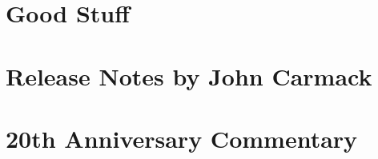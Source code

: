 \documentclass[8pt]{book}
\begin{document}
    \chapter{Good Stuff}
          
    \chapter{Release Notes by John Carmack}
        
    \chapter{20th Anniversary Commentary}
        

    
    \cleartoleftpage %
    
    \blankpage
    \blankpage
\end{document}
